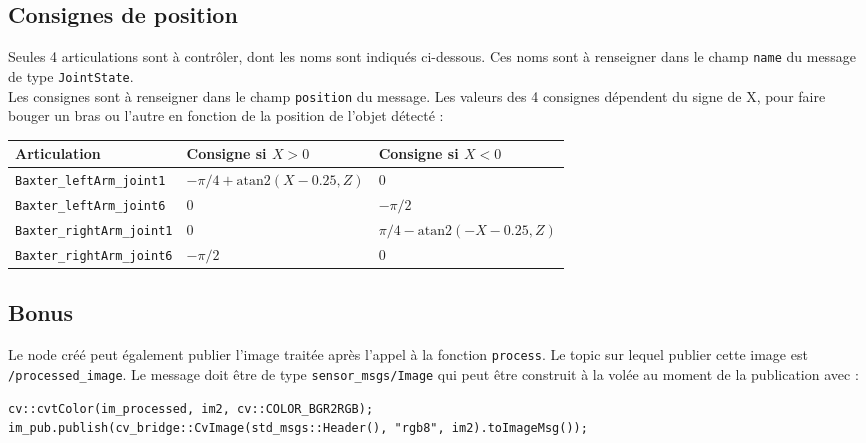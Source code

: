 \documentclass{ecnreport}
\begin{document}
\subsection{Consignes de position}

Seules 4 articulations sont à contrôler, dont les noms sont indiqués ci-dessous. 
Ces noms sont à renseigner dans le champ \texttt{name} du message de type \texttt{JointState}. \\
Les consignes sont à renseigner dans le champ \texttt{position} du message. Les valeurs des 4 consignes dépendent du signe de X, pour faire bouger un bras ou l'autre
en fonction de la position de l'objet détecté :
 \begin{center}
  \begin{tabular}{|C{6cm}|C{5cm}|C{5cm}|}\hline
   Articulation & Consigne si $X > 0$ & Consigne si $X < 0$ \\\hline
   \texttt{Baxter\_leftArm\_joint1} & $-\pi/4 + \text{atan2}(X-0.25,Z)$& $0$\\\hline
   \texttt{Baxter\_leftArm\_joint6} & $0$& $-\pi/2$\\\hline
   \texttt{Baxter\_rightArm\_joint1} & $0$& $\pi/4 - \text{atan2}(-X-0.25,Z)$\\\hline
   \texttt{Baxter\_rightArm\_joint6} & $-\pi/2$ & 0\\\hline
  \end{tabular}
 \end{center}
 


\subsection{Bonus}

Le node créé peut également publier l'image traitée après l'appel à la fonction \texttt{process}. Le topic sur lequel publier cette image est \texttt{/processed\_image}.
Le message doit être de type \texttt{sensor\_msgs/Image} qui peut être construit à la volée au moment de la publication avec :
\cppstyle
\begin{lstlisting}
cv::cvtColor(im_processed, im2, cv::COLOR_BGR2RGB);
im_pub.publish(cv_bridge::CvImage(std_msgs::Header(), "rgb8", im2).toImageMsg());
\end{lstlisting} 
\end{document}
